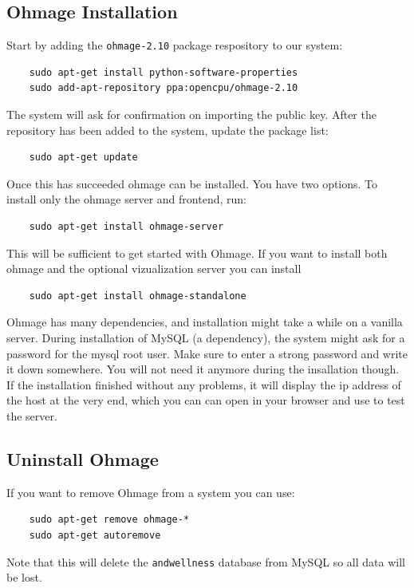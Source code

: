 \documentclass{scrartcl}
\begin{document}
\subsection{Ohmage Installation}

Start by adding the \texttt{ohmage-2.10} package respository to our system:

\begin{verbatim}
    sudo apt-get install python-software-properties
    sudo add-apt-repository ppa:opencpu/ohmage-2.10
\end{verbatim}
The system will ask for confirmation on importing the public key. After the
repository has been added to the system, update the package list:

\begin{verbatim}
    sudo apt-get update
\end{verbatim}
Once this has succeeded ohmage can be installed. You have two options. To
install only the ohmage server and frontend, run:

\begin{verbatim}
    sudo apt-get install ohmage-server
\end{verbatim}
This will be sufficient to get started with Ohmage. If you want to install both
ohmage and the optional vizualization server you can install

\begin{verbatim}
    sudo apt-get install ohmage-standalone
\end{verbatim}
Ohmage has many dependencies, and installation might take a while on a vanilla
server. During installation of MySQL (a dependency), the system might ask for a
password for the mysql root user. Make sure to enter a strong password and write
it down somewhere. You will not need it anymore during the insallation though.\\

\noindent If the installation finished without any problems, it will display the
ip address of the host at the very end, which you can can open in your browser and use to test the server.

\subsection{Uninstall Ohmage}

If you want to remove Ohmage from a system you can use:

\begin{verbatim}
    sudo apt-get remove ohmage-*
    sudo apt-get autoremove
\end{verbatim}
Note that this will delete the \texttt{andwellness} database from MySQL so all
data will be lost.
\end{document}
